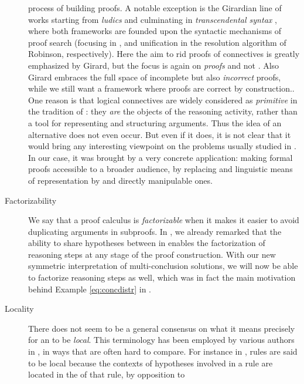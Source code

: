 \begin{description}
{    process of building proofs. A notable exception is the Girardian line of
    works starting from \emph{ludics} \cite{girard_locus_2001} and culminating
    in \emph{transcendental syntax} \cite{eng_exegesis_2023}, where both
    frameworks are founded upon the syntactic mechanisms of proof search
    (focusing in , and unification in the resolution algorithm
    of Robinson, respectively). Here the aim to rid proofs of connectives is
    greatly emphasized by Girard, but the focus is again on \emph{proofs} and
    not \emph{}. Also Girard embraces the full space of incomplete
    but also \emph{incorrect} proofs, while we still want a framework where
    proofs are correct by construction.}. One reason is that logical connectives
    are widely considered as \emph{primitive} in the tradition of : they \emph{are} the objects of the reasoning activity, rather than a
    tool for representing and structuring arguments. Thus the idea of an
    alternative does not even occur. But even if it does, it is not clear that
    it would bring any interesting viewpoint on the problems usually studied in
    . In our case, it was brought by a very concrete application:
    making formal proofs accessible to a broader audience, by replacing 
    and linguistic means of representation by  and directly manipulable
    ones.
  \item[Factorizability]
    We say that a proof calculus is \emph{factorizable} when it makes it easier
    to avoid duplicating arguments in subproofs. In , we
    already remarked that the ability to share hypotheses between  in
     enables the factorization of \emph{} reasoning steps at any
    stage of the proof construction. With our new symmetric interpretation of
    multi-conclusion solutions, we will now be able to factorize \emph{}
    reasoning steps as well, which was in fact the main motivation behind
    Example \ref{eq:concdistr} in .
  \item[Locality]
    There does not seem to be a general consensus on what it means precisely for
    an  to be \emph{local}. This terminology has been
    employed by various authors in , in ways that are often
    hard to compare. For instance in , rules are
    said to be local because the contexts of hypotheses involved in a rule are
    located in the  of that rule, by opposition to 
\end{description}
